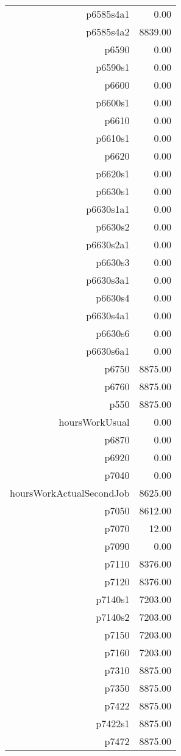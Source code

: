 \begin{table}[ht]
\begin{tabular}{rr}
  p6585s4a1 & 0.00 \\ 
  p6585s4a2 & 8839.00 \\ 
  p6590 & 0.00 \\ 
  p6590s1 & 0.00 \\ 
  p6600 & 0.00 \\ 
  p6600s1 & 0.00 \\ 
  p6610 & 0.00 \\ 
  p6610s1 & 0.00 \\ 
  p6620 & 0.00 \\ 
  p6620s1 & 0.00 \\ 
  p6630s1 & 0.00 \\ 
  p6630s1a1 & 0.00 \\ 
  p6630s2 & 0.00 \\ 
  p6630s2a1 & 0.00 \\ 
  p6630s3 & 0.00 \\ 
  p6630s3a1 & 0.00 \\ 
  p6630s4 & 0.00 \\ 
  p6630s4a1 & 0.00 \\ 
  p6630s6 & 0.00 \\ 
  p6630s6a1 & 0.00 \\ 
  p6750 & 8875.00 \\ 
  p6760 & 8875.00 \\ 
  p550 & 8875.00 \\ 
  hoursWorkUsual & 0.00 \\ 
  p6870 & 0.00 \\ 
  p6920 & 0.00 \\ 
  p7040 & 0.00 \\ 
  hoursWorkActualSecondJob & 8625.00 \\ 
  p7050 & 8612.00 \\ 
  p7070 & 12.00 \\ 
  p7090 & 0.00 \\ 
  p7110 & 8376.00 \\ 
  p7120 & 8376.00 \\ 
  p7140s1 & 7203.00 \\ 
  p7140s2 & 7203.00 \\ 
  p7150 & 7203.00 \\ 
  p7160 & 7203.00 \\ 
  p7310 & 8875.00 \\ 
  p7350 & 8875.00 \\ 
  p7422 & 8875.00 \\ 
  p7422s1 & 8875.00 \\ 
  p7472 & 8875.00 \\ 

\end{tabular}
\end{table}
